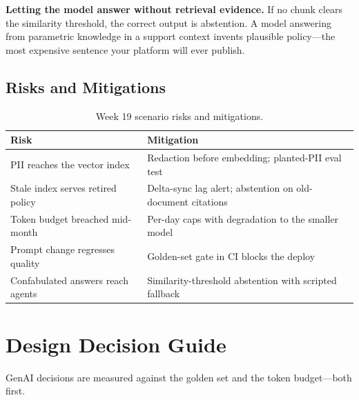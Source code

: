 \begin{pitfall}
\textbf{Letting the model answer without retrieval evidence.} If no chunk clears the similarity threshold, the correct output is abstention. A model answering from parametric knowledge in a support context invents plausible policy---the most expensive sentence your platform will ever publish.
\end{pitfall}

\subsection{Risks and Mitigations}
\begin{table}[H]
\centering
\small
\begin{tabular}{@{}p{4.6cm}p{7.6cm}@{}}
\toprule
\textbf{Risk} & \textbf{Mitigation} \\
\midrule
PII reaches the vector index & Redaction before embedding; planted-PII eval test \\
Stale index serves retired policy & Delta-sync lag alert; abstention on old-document citations \\
Token budget breached mid-month & Per-day caps with degradation to the smaller model \\
Prompt change regresses quality & Golden-set gate in CI blocks the deploy \\
Confabulated answers reach agents & Similarity-threshold abstention with scripted fallback \\
\bottomrule
\end{tabular}
\caption{Week 19 scenario risks and mitigations.}
\label{tab:ch19-risks}
\end{table}

\section{Design Decision Guide}
%
GenAI decisions are measured against the golden set and the token budget---both first.

